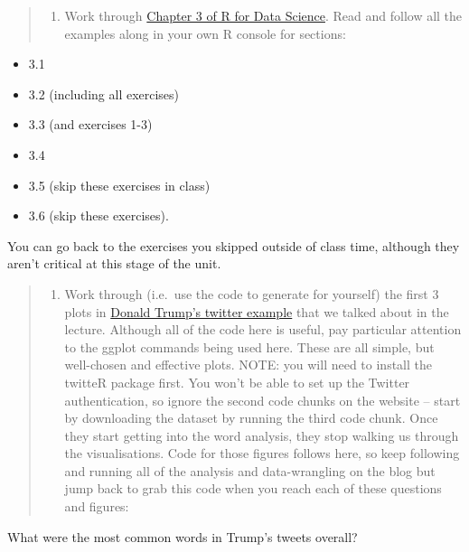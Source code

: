 \documentclass[]{article}
\providecommand{\tightlist}{%
  \setlength{\itemsep}{0pt}\setlength{\parskip}{0pt}}
\begin{document}
\begin{quote}
\begin{enumerate}
\def\labelenumi{\arabic{enumi}.}
\setcounter{enumi}{5}
\tightlist
\item
  Work through
  \href{https://r4ds.had.co.nz/data-visualisation.html}{Chapter 3 of R
  for Data Science}. Read and follow all the examples along in your own
  R console for sections:
\end{enumerate}
\end{quote}

\begin{itemize}
\tightlist
\item
  3.1
\item
  3.2 (including all exercises)
\item
  3.3 (and exercises 1-3)
\item
  3.4
\item
  3.5 (skip these exercises in class)
\item
  3.6 (skip these exercises).
\end{itemize}

You can go back to the exercises you skipped outside of class time,
although they aren't critical at this stage of the unit.

\begin{quote}
\begin{enumerate}
\def\labelenumi{\arabic{enumi}.}
\setcounter{enumi}{6}
\tightlist
\item
  Work through (i.e.~use the code to generate for yourself) the first 3
  plots in \href{http://varianceexplained.org/r/trump-tweets/}{Donald
  Trump's twitter example} that we talked about in the lecture. Although
  all of the code here is useful, pay particular attention to the ggplot
  commands being used here. These are all simple, but well-chosen and
  effective plots. NOTE: you will need to install the twitteR package
  first. You won't be able to set up the Twitter authentication, so
  ignore the second code chunks on the website -- start by downloading
  the dataset by running the third code chunk. Once they start getting
  into the word analysis, they stop walking us through the
  visualisations. Code for those figures follows here, so keep following
  and running all of the analysis and data-wrangling on the blog but
  jump back to grab this code when you reach each of these questions and
  figures:
\end{enumerate}
\end{quote}

What were the most common words in Trump's tweets overall?
\end{document}
